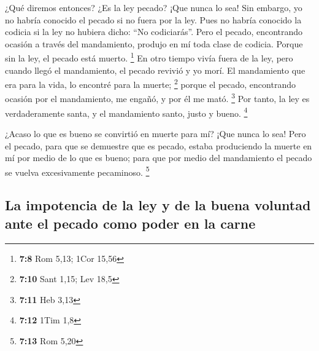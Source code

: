 \begin{paracol}{2}
 ¿Qué diremos entonces? ¿Es la ley pecado? ¡Que nunca lo
sea! Sin embargo, yo no habría conocido el pecado si no fuera por la
ley. Pues no habría conocido la codicia si la ley no hubiera dicho: ``No
codiciarás''.  Pero el pecado, encontrando ocasión a
través del mandamiento, produjo en mí toda clase de codicia. Porque sin
la ley, el pecado está muerto. \footnote{\textbf{7:8} Rom 5,13; 1Cor
  15,56}  En otro tiempo vivía fuera de la ley, pero
cuando llegó el mandamiento, el pecado revivió y yo morí.
 El mandamiento que era para la vida, lo encontré para la
muerte; \footnote{\textbf{7:10} Sant 1,15; Lev 18,5} 
porque el pecado, encontrando ocasión por el mandamiento, me engañó, y
por él me mató. \footnote{\textbf{7:11} Heb 3,13}  Por
tanto, la ley es verdaderamente santa, y el mandamiento santo, justo y
bueno. \footnote{\textbf{7:12} 1Tim 1,8}

 ¿Acaso lo que es bueno se convirtió en muerte para mí?
¡Que nunca lo sea! Pero el pecado, para que se demuestre que es pecado,
estaba produciendo la muerte en mí por medio de lo que es bueno; para
que por medio del mandamiento el pecado se vuelva excesivamente
pecaminoso. \footnote{\textbf{7:13} Rom 5,20}

\hypertarget{la-impotencia-de-la-ley-y-de-la-buena-voluntad-ante-el-pecado-como-poder-en-la-carne}{%
\subsection{La impotencia de la ley y de la buena voluntad ante el
pecado como poder en la
carne}\label{la-impotencia-de-la-ley-y-de-la-buena-voluntad-ante-el-pecado-como-poder-en-la-carne}}


\end{paracol}
